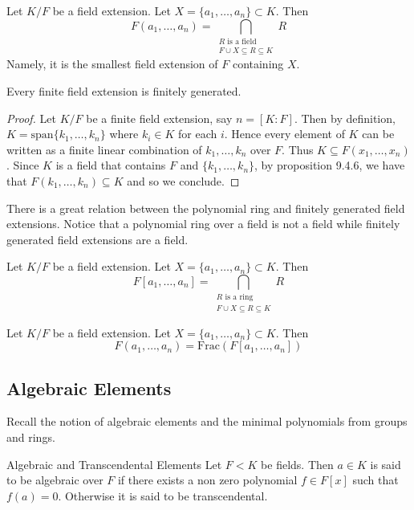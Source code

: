 \documentclass[a4paper]{article}
\begin{document}
\begin{prp}{}{} Let $K/F$ be a field extension. Let $X=\{a_1,\dots,a_n\}\subset K$. Then $$F(a_1,\dots,a_n)=\bigcap_{\substack{R\text{ is a field}\\F\cup X\subseteq R\subseteq K}}R$$ Namely, it is the smallest field extension of $F$ containing $X$. 
\end{prp}

\begin{prp}{}{} Every finite field extension is finitely generated. \tcbline
\begin{proof}
Let $K/F$ be a finite field extension, say $n=[K:F]$. Then by definition, $K=\text{span}\{k_1,\dots,k_n\}$ where $k_i\in K$ for each $i$. Hence every element of $K$ can be written as a finite linear combination of $k_1,\dots,k_n$ over $F$. Thus $K\subseteq F(x_1,\dots,x_n)$. Since $K$ is a field that contains $F$ and $\{k_1,\dots,k_n\}$, by proposition 9.4.6, we have that $F(k_1,\dots,k_n)\subseteq K$ and so we conclude. 
\end{proof}
\end{prp}

There is a great relation between the polynomial ring and finitely generated field extensions. Notice that a polynomial ring over a field is not a field while finitely generated field extensions are a field. 

\begin{prp}{}{} Let $K/F$ be a field extension. Let $X=\{a_1,\dots,a_n\}\subset K$. Then $$F[a_1,\dots,a_n]=\bigcap_{\substack{R\text{ is a ring}\\F\cup X\subseteq R\subseteq K}}R$$
\end{prp}

\begin{prp}{}{} Let $K/F$ be a field extension. Let $X=\{a_1,\dots,a_n\}\subset K$. Then $$F(a_1,\dots,a_n)=\text{Frac}\left(F[a_1,\dots,a_n]\right)$$
\end{prp}

\subsection{Algebraic Elements}
Recall the notion of algebraic elements and the minimal polynomials from groups and rings. 

\begin{defn}{Algebraic and Transcendental Elements}{} Let $F<K$ be fields. Then $a\in K$ is said to be algebraic over $F$ if there exists a non zero polynomial $f\in F[x]$ such that $f(a)=0$. Otherwise it is said to be transcendental. 
\end{defn}
\end{document}
